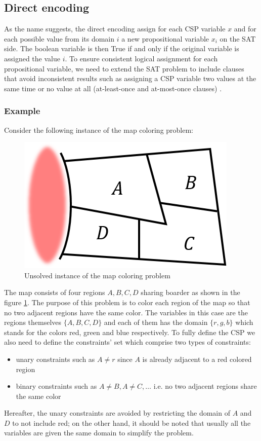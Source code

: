 \subsection{Direct encoding}
As the name suggests, the direct encoding assign for each CSP variable $x$ and for each possible value from its domain $i$ a new propositional variable $x_i$ on the SAT side. The boolean variable is then True if and only if the original variable is assigned the value $i$.  To ensure consistent logical assignment for each propositional variable, we need to extend the SAT problem to include clauses that avoid inconsistent results such as assigning a CSP variable two values at the same time or no value at all (at-least-once and at-most-once clauses) \cite{petke2011order}.

\subsubsection{Example}
Consider the following instance of the map coloring problem:\\
\begin{figure}[H]
	\centering
	\includegraphics[width=0.5\linewidth]{assets/map_coloring_unsolved}
	\captionsetup{justification=centering,margin=2cm}
	\caption{Unsolved instance of the map coloring problem}
	\label{fig:map_coloring_unsolved}
\end{figure}  
The map consists of four regions $A,B,C,D$ sharing boarder as shown in the figure \ref{fig:map_coloring_unsolved}. The purpose of this problem is to color each region of the map so that no two adjacent regions have the same color. The variables in this case are the regions themselves $\{A,B,C,D\}$ and each of them has the domain $\{r,g,b\}$ which stands for the colors red, green and blue respectively. To fully define the CSP we also need to define the constraints' set which comprise two types of constraints: 
\begin{itemize}
	\item unary constraints such as $A\neq r$ since $A$ is already adjacent to a red colored region 
	\item binary constraints such as $A\neq B, A\neq C,\dots$ i.e. no two adjacent regions share the same color
\end{itemize}
Hereafter, the unary constraints are avoided by restricting the domain of $A$ and $D$ to not include red; on the other hand, it should be noted that usually all the variables are given the same domain to simplify the problem.

